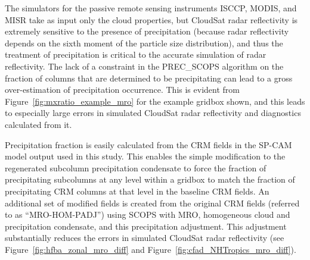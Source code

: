 The simulators for the passive remote sensing instruments ISCCP, MODIS,
and MISR take as input only the cloud properties, but CloudSat radar
reflectivity is extremely sensitive to the presence of precipitation
(because radar reflectivity depends on the sixth moment of the particle
size distribution), and thus the treatment of precipitation is critical
to the accurate simulation of radar reflectivity. The lack of a
constraint in the PREC\_SCOPS algorithm on the fraction of columns that
are determined to be precipitating can lead to a gross over-estimation
of precipitation occurrence. This is evident from
Figure~\ref{fig:mxratio_example_mro} for the example gridbox shown, and
this leads to especially large errors in simulated CloudSat radar
reflectivity and diagnostics calculated from it.

Precipitation fraction is easily calculated from the CRM fields in the
SP-CAM model output used in this study. This enables the simple
modification to the regenerated subcolumn precipitation condensate to
force the fraction of precipitating subcolumns at any level within a
gridbox to match the fraction of precipitating CRM columns at that level
in the baseline CRM fields. An additional set of modified fields is
created from the original CRM fields (referred to as ``MRO-HOM-PADJ'')
using SCOPS with MRO, homogeneous cloud and precipitation condensate,
and this precipitation adjustment. This adjustment substantially reduces
the errors in simulated CloudSat radar reflectivity (see
Figure~\ref{fig:hfba_zonal_mro_diff} and
Figure~\ref{fig:cfad_NHTropics_mro_diff}).

